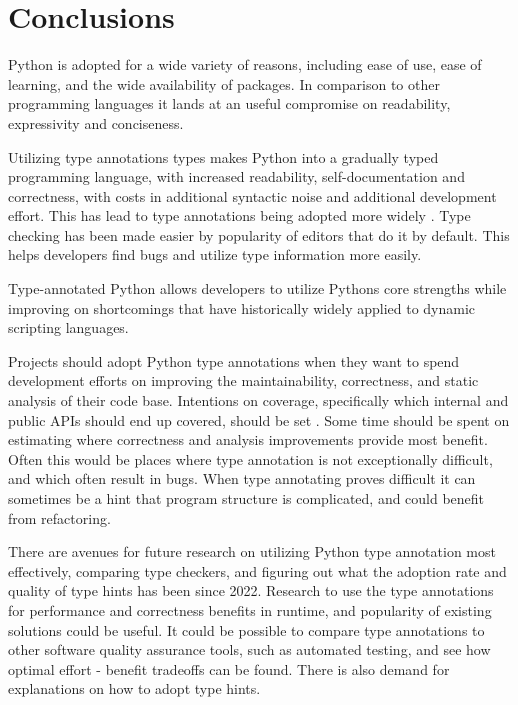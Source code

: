 \chapter{Conclusions\label{conclusions}}

Python is adopted for a wide variety of reasons, including ease of use, ease of learning, and the wide availability of packages. In comparison to other programming languages it lands at an useful compromise on readability, expressivity and conciseness.

Utilizing type annotations types makes Python into a gradually typed programming language, with increased readability, self-documentation and correctness, with costs in additional syntactic noise and additional development effort. This has lead to type annotations being adopted more widely \cite{jin_where_to_start_2021, khan_empirical_2022}.  Type checking has been made easier by popularity of editors that do it by default. This helps developers find bugs and utilize type information more easily. 

Type-annotated Python allows developers to utilize Pythons core strengths while improving on shortcomings that have historically widely applied to dynamic scripting languages.

Projects should adopt Python type annotations when they want to spend development efforts on improving the maintainability, correctness, and static analysis of their code base. Intentions on coverage, specifically which internal and public APIs should end up covered, should be set  \cite{jin_where_to_start_2021}. Some time should be spent on estimating where correctness and analysis improvements provide most benefit. Often this would be places where type annotation is not exceptionally difficult, and which often result in bugs. When type annotating proves difficult it can sometimes be a hint that program structure is complicated, and could benefit from refactoring.

There are avenues for future research on utilizing Python type annotation most effectively, comparing type checkers, and figuring out what the adoption rate and quality of type hints has been since 2022. Research to use the type annotations for performance and correctness benefits in runtime, and popularity of existing solutions could be useful. It could be possible to compare type annotations to other software quality assurance tools, such as automated testing, and see how optimal effort - benefit tradeoffs can be found. There is also demand for explanations on how to adopt type hints.

